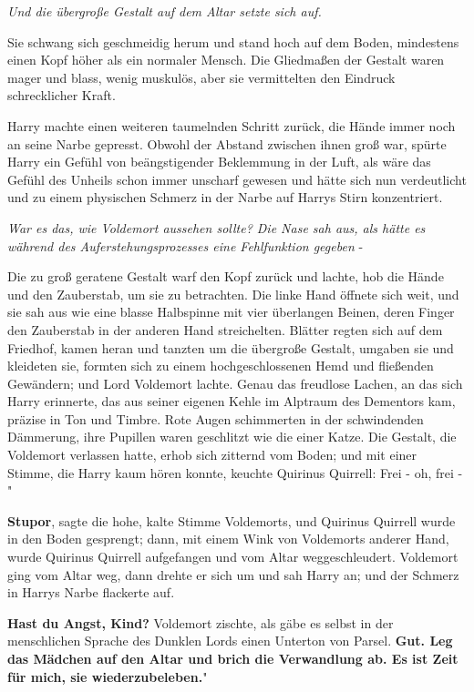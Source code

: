 \emph{Und die übergroße Gestalt auf dem
Altar setzte sich auf.}

Sie schwang sich geschmeidig herum und stand hoch auf dem Boden, mindestens
einen Kopf höher als ein normaler Mensch. Die Gliedmaßen der Gestalt waren mager
und blass, wenig muskulös, aber sie vermittelten den Eindruck schrecklicher
Kraft.

Harry machte einen weiteren taumelnden Schritt zurück, die Hände immer noch an
seine Narbe gepresst. Obwohl der Abstand zwischen ihnen groß war, spürte Harry
ein Gefühl von beängstigender Beklemmung in der Luft, als wäre das Gefühl des
Unheils schon immer unscharf gewesen und hätte sich nun verdeutlicht und zu
einem physischen Schmerz in der Narbe auf Harrys Stirn konzentriert.

\emph{War es das, wie Voldemort aussehen sollte? Die Nase sah aus, als hätte es
während des Auferstehungsprozesses eine Fehlfunktion gegeben} -

Die zu groß geratene Gestalt warf den Kopf zurück und lachte, hob die Hände und
den Zauberstab, um sie zu betrachten. Die linke Hand öffnete sich weit, und sie
sah aus wie eine blasse Halbspinne mit vier überlangen Beinen, deren Finger den
Zauberstab in der anderen Hand streichelten. Blätter regten sich auf dem
Friedhof, kamen heran und tanzten um die übergroße Gestalt, umgaben sie und
kleideten sie, formten sich zu einem hochgeschlossenen Hemd und fließenden
Gewändern; und Lord Voldemort lachte. Genau das freudlose Lachen, an das sich
Harry erinnerte, das aus seiner eigenen Kehle im Alptraum des Dementors kam,
präzise in Ton und Timbre. Rote Augen schimmerten in der schwindenden Dämmerung,
ihre Pupillen waren geschlitzt wie die einer Katze. Die Gestalt, die Voldemort
verlassen hatte, erhob sich zitternd vom Boden; und mit einer Stimme, die Harry
kaum hören konnte, keuchte Quirinus Quirrell: \glqq{}Frei - oh, frei -"

\glqq{}\textbf{Stupor}\grqq{}, sagte die hohe, kalte Stimme Voldemorts, und
Quirinus Quirrell wurde in den Boden gesprengt; dann, mit einem Wink von
Voldemorts anderer Hand, wurde Quirinus Quirrell aufgefangen und vom Altar
weggeschleudert. Voldemort ging vom Altar weg, dann drehte er sich um und sah
Harry an; und der Schmerz in Harrys Narbe flackerte auf.

\glqq{}\textbf{Hast du Angst, Kind?}\grqq{} Voldemort zischte, als gäbe es selbst
in der menschlichen Sprache des Dunklen Lords einen Unterton von Parsel. \glqq
\textbf{Gut. Leg das Mädchen auf den Altar und brich die Verwandlung ab. Es ist
Zeit für mich, sie wiederzubeleben.}"


